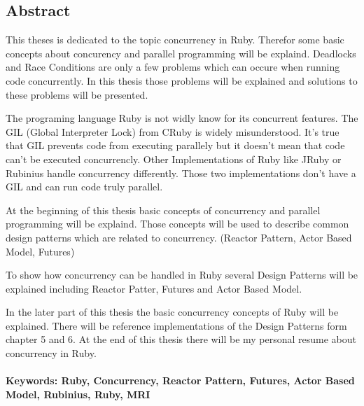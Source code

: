 \subsection*{Abstract}

This theses is dedicated to the topic concurrency in Ruby. Therefor some basic concepts about concurency and parallel programming will be explaind. Deadlocks and Race Conditions are only a few problems which can occure when running code concurrently. In this thesis those problems will be explained and solutions to these problems will be presented. 

The programing language Ruby is not widly know for its concurrent features. The GIL (Global Interpreter Lock) from CRuby is widely misunderstood. It's true that GIL prevents code from executing parallely but it doesn't mean that code can't be executed concurrencly. Other Implementations of Ruby like JRuby or Rubinius handle concurrency differently. Those two implementations don't have a GIL and can run code truly parallel.

At the beginning of this thesis basic concepts of concurrency and parallel programming will be explaind. Those concepts will be used to describe common design patterns which are related to concurrency. (Reactor Pattern, Actor Based Model, Futures)




To show how concurrency can be handled in Ruby several Design Patterns will be explained including Reactor Patter, Futures and Actor Based Model. 

In the later part of this thesis the basic concurrency concepts of Ruby will be explained. There will be reference implementations of the Design Patterns form chapter 5 and 6. At the end of this thesis there will be my personal resume about concurrency in Ruby.






\paragraph{Keywords:  Ruby, Concurrency, Reactor Pattern, Futures, Actor Based Model, Rubinius, Ruby, MRI}

